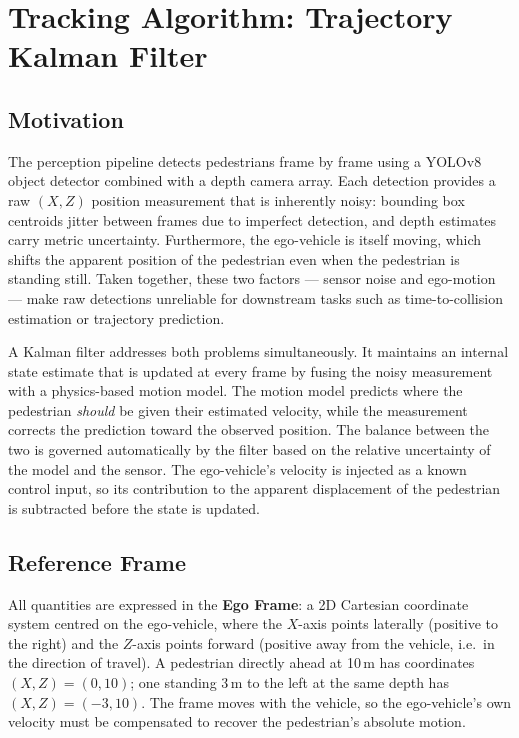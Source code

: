 \section{Tracking Algorithm: Trajectory Kalman Filter}

\subsection*{Motivation}

The perception pipeline detects pedestrians frame by frame using a YOLOv8 object detector combined with a depth camera array. Each detection provides a raw $(X, Z)$ position measurement that is inherently noisy: bounding box centroids jitter between frames due to imperfect detection, and depth estimates carry metric uncertainty. Furthermore, the ego-vehicle is itself moving, which shifts the apparent position of the pedestrian even when the pedestrian is standing still. Taken together, these two factors --- sensor noise and ego-motion --- make raw detections unreliable for downstream tasks such as time-to-collision estimation or trajectory prediction.

A Kalman filter addresses both problems simultaneously. It maintains an internal state estimate that is updated at every frame by fusing the noisy measurement with a physics-based motion model. The motion model predicts where the pedestrian \emph{should} be given their estimated velocity, while the measurement corrects the prediction toward the observed position. The balance between the two is governed automatically by the filter based on the relative uncertainty of the model and the sensor. The ego-vehicle's velocity is injected as a known control input, so its contribution to the apparent displacement of the pedestrian is subtracted before the state is updated.

\subsection*{Reference Frame}

All quantities are expressed in the \textbf{Ego Frame}: a 2D Cartesian coordinate system centred on the ego-vehicle, where the $X$-axis points laterally (positive to the right) and the $Z$-axis points forward (positive away from the vehicle, i.e.\ in the direction of travel). A pedestrian directly ahead at 10\,m has coordinates $(X, Z) = (0, 10)$; one standing 3\,m to the left at the same depth has $(X, Z) = (-3, 10)$. The frame moves with the vehicle, so the ego-vehicle's own velocity must be compensated to recover the pedestrian's absolute motion.


